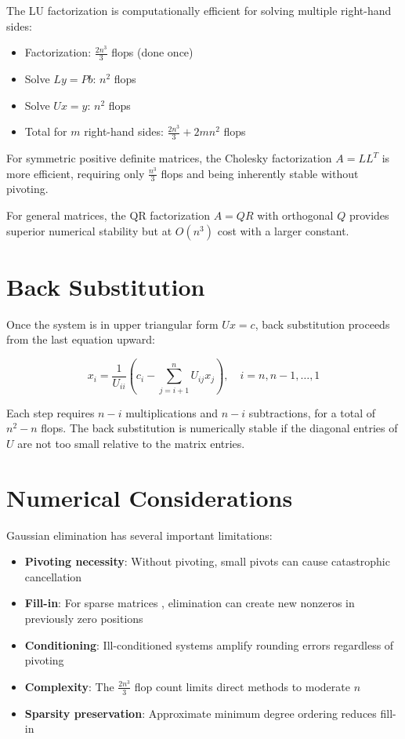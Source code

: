 The LU factorization is computationally efficient for solving multiple right-hand sides:
\begin{itemize}
    \item Factorization: $\frac{2n^3}{3}$ flops (done once)
    \item Solve $Ly = Pb$: $n^2$ flops
    \item Solve $Ux = y$: $n^2$ flops
    \item Total for $m$ right-hand sides: $\frac{2n^3}{3} + 2mn^2$ flops
\end{itemize}

For symmetric positive definite matrices, the Cholesky factorization $A = LL^T$ is more efficient, requiring only $\frac{n^3}{3}$ flops and being inherently stable without pivoting.

For general matrices, the QR factorization $A = QR$ with orthogonal $Q$ provides superior numerical stability but at $O(n^3)$ cost with a larger constant.

\section{Back Substitution}

Once the system is in upper triangular form $Ux = c$, back substitution proceeds from the last equation upward:

\[
x_i = \frac{1}{U_{ii}}\left(c_i - \sum_{j=i+1}^{n} U_{ij}x_j\right), \quad i = n, n-1, \ldots, 1
\]

Each step requires $n-i$ multiplications and $n-i$ subtractions, for a total of $n^2 - n$ flops. The back substitution is numerically stable if the diagonal entries of $U$ are not too small relative to the matrix entries.

\section{Numerical Considerations}

Gaussian elimination has several important limitations:
\begin{itemize}
    \item \textbf{Pivoting necessity}: Without pivoting, small pivots can cause catastrophic cancellation
    \item \textbf{Fill-in}: For sparse matrices , elimination can create new nonzeros in previously zero positions
    \item \textbf{Conditioning}: Ill-conditioned systems amplify rounding errors regardless of pivoting
    \item \textbf{Complexity}: The $\frac{2n^3}{3}$ flop count limits direct methods to moderate $n$
    \item \textbf{Sparsity preservation}: Approximate minimum degree ordering reduces fill-in
\end{itemize}

